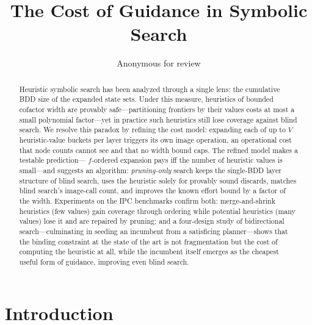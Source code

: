 \documentclass[letterpaper]{article}
\title{The Cost of Guidance in Symbolic Search}
\author{Anonymous for review}
\date{}
\newcommand{\values}{\ensuremath{V}}
\theoremstyle{plain}
\theoremstyle{definition}
\theoremstyle{remark}
\begin{document}
\maketitle

\begin{abstract}
Heuristic symbolic search has been analyzed through a single lens: the
cumulative BDD size of the expanded state sets. Under this measure,
heuristics of bounded cofactor width are provably safe---partitioning
frontiers by their values costs at most a small polynomial factor---yet
in practice such heuristics still lose coverage against blind search.
We resolve this paradox by refining the cost model: expanding each of up
to $\values$ heuristic-value buckets per layer triggers its own image
operation, an operational cost that node counts cannot see and that no
width bound caps. The refined model makes a testable prediction---%
$f$-ordered expansion pays iff the number of heuristic values is
small---and suggests an algorithm: \emph{pruning-only} search keeps the
single-BDD layer structure of blind search, uses the heuristic solely
for provably sound discards, matches blind search's image-call count,
and improves the known effort bound by a factor of the width.
Experiments on the IPC benchmarks confirm both: merge-and-shrink
heuristics (few values) gain coverage through ordering while potential
heuristics (many values) lose it and are repaired by pruning; and a
four-design study of bidirectional search---culminating in seeding an
incumbent from a satisficing planner---shows that the binding constraint
at the state of the art is not fragmentation but the cost of computing
the heuristic at all, while the incumbent itself emerges as the cheapest
useful form of guidance, improving even blind search.
\end{abstract}

\section{Introduction}
\end{document}
